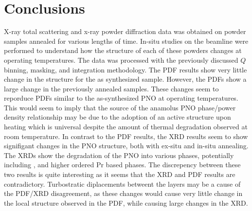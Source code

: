 \section{Conclusions}
X-ray total scattering and x-ray powder diffraction data was obtained on  powder samples annealed for various lengths of time.
In-situ studies on the beamline were performed to understand how the structure of each of these powders changes at operating temperatures.
The data was processed with the previously discussed $Q$ binning, masking, and integration methodology.
The PDF results show very little change in the structure for the as synthesized sample.
However, the PDFs show a large change in the previously annealed samples.
These changes seem to reporduce PDFs similar to the as-synthesized PNO at operating temperatures.
This would seem to imply that the source of the anamolus PNO phase/power density relationship may be due to the adoption of an active structure upon heating which is universal despite the amount of thermal degradation observed at room temperature.
In contrast to the PDF results, the XRD results seem to show signifigant changes in the PNO structure, both with ex-situ and in-situ annealing.
The XRDs show the degradation of the PNO into various phases, potentially including , and higher ordered Pr based phases.
The discrepency between these two results is quite interesting as it seems that the XRD and PDF results are contradictory.
Turbostratic diplacements betweent the layers may be a cause of the PDF/XRD disagreement, as these changes would cause very little change in the local structure observed in the PDF, while causing large changes in the XRD.